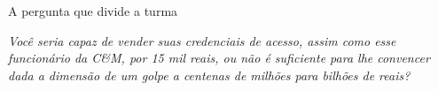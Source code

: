\begin{frame}{A pergunta que divide a turma}
  \vfill
  \noindent\hspace{0.45cm}%
  {\color{cefetAccent!40}\fontsize{17}{17}\selectfont\faQuoteLeft\par}
  \vspace{0.45em}
  \begin{center}
    \begin{minipage}{0.88\linewidth}
      \centering
      {\normalsize\itshape
      Você seria capaz de vender suas credenciais de acesso, assim como esse funcionário da C\&M, por 15 mil reais, ou não é suficiente para lhe convencer dada a dimensão de um golpe a centenas de milhões para bilhões de reais?\par}
    \end{minipage}
  \end{center}
  \vfill
\end{frame}
